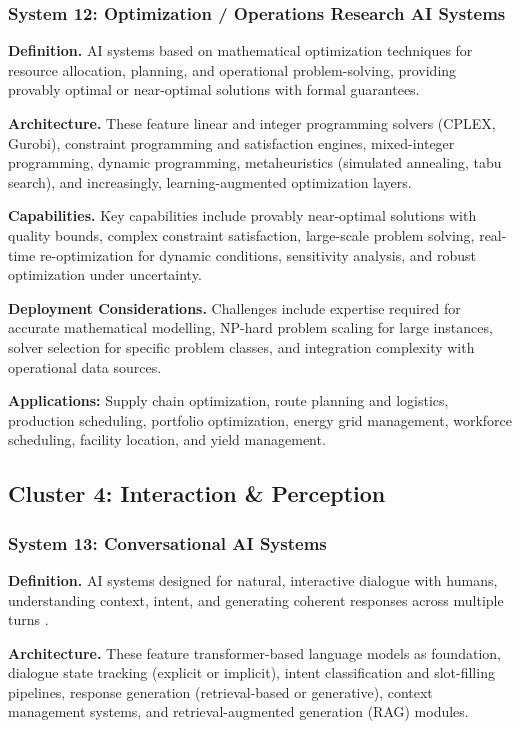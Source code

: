 \documentclass[acmsmall,screen,review]{acmart}
\begin{document}
\subsubsection{System 12: Optimization / Operations Research AI Systems}
\textbf{Definition.} AI systems based on mathematical optimization techniques for resource allocation, planning, and operational problem-solving, providing provably optimal or near-optimal solutions with formal guarantees.

\textbf{Architecture.} These feature linear and integer programming solvers (CPLEX, Gurobi), constraint programming and satisfaction engines, mixed-integer programming, dynamic programming, metaheuristics (simulated annealing, tabu search), and increasingly, learning-augmented optimization layers.

\textbf{Capabilities.} Key capabilities include provably near-optimal solutions with quality bounds, complex constraint satisfaction, large-scale problem solving, real-time re-optimization for dynamic conditions, sensitivity analysis, and robust optimization under uncertainty.

\textbf{Deployment Considerations.} Challenges include expertise required for accurate mathematical modelling, NP-hard problem scaling for large instances, solver selection for specific problem classes, and integration complexity with operational data sources.

\textbf{Applications:} Supply chain optimization, route planning and logistics, production scheduling, portfolio optimization, energy grid management, workforce scheduling, facility location, and yield management.

\subsection{Cluster 4: Interaction \& Perception}

\subsubsection{System 13: Conversational AI Systems}
\textbf{Definition.} AI systems designed for natural, interactive dialogue with humans, understanding context, intent, and generating coherent responses across multiple turns \cite{vaswani2017attention}.

\textbf{Architecture.} These feature transformer-based language models as foundation, dialogue state tracking (explicit or implicit), intent classification and slot-filling pipelines, response generation (retrieval-based or generative), context management systems, and retrieval-augmented generation (RAG) modules.
\end{document}
